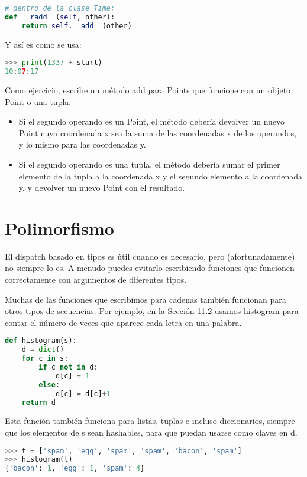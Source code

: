 \begin{lstlisting}[language=Python]
# dentro de la clase Time:
def __radd__(self, other):
    return self.__add__(other)
\end{lstlisting}

Y así es como se usa:

\begin{lstlisting}[language=Python]
>>> print(1337 + start)
10:07:17
\end{lstlisting}

Como ejercicio, escribe un método add para Points que funcione con un objeto Point o una tupla:

\begin{itemize}
\item Si el segundo operando es un Point, el método debería devolver un nuevo Point cuya coordenada x sea la suma de las coordenadas x de los operandos, y lo mismo para las coordenadas y.
\item Si el segundo operando es una tupla, el método debería sumar el primer elemento de la tupla a la coordenada x y el segundo elemento a la coordenada y, y devolver un nuevo Point con el resultado.
\end{itemize}

\section{Polimorfismo}

El dispatch basado en tipos es útil cuando es necesario, pero (afortunadamente) no siempre lo es. A menudo puedes evitarlo escribiendo funciones que funcionen correctamente con argumentos de diferentes tipos.

Muchas de las funciones que escribimos para cadenas también funcionan para otros tipos de secuencias. Por ejemplo, en la Sección 11.2 usamos histogram para contar el número de veces que aparece cada letra en una palabra.

\begin{lstlisting}[language=Python]
def histogram(s):
    d = dict()
    for c in s:
        if c not in d:
            d[c] = 1
        else:
            d[c] = d[c]+1
    return d
\end{lstlisting}

Esta función también funciona para listas, tuplas e incluso diccionarios, siempre que los elementos de s sean hashables, para que puedan usarse como claves en d.

\begin{lstlisting}[language=Python]
>>> t = ['spam', 'egg', 'spam', 'spam', 'bacon', 'spam']
>>> histogram(t)
{'bacon': 1, 'egg': 1, 'spam': 4}
\end{lstlisting}

